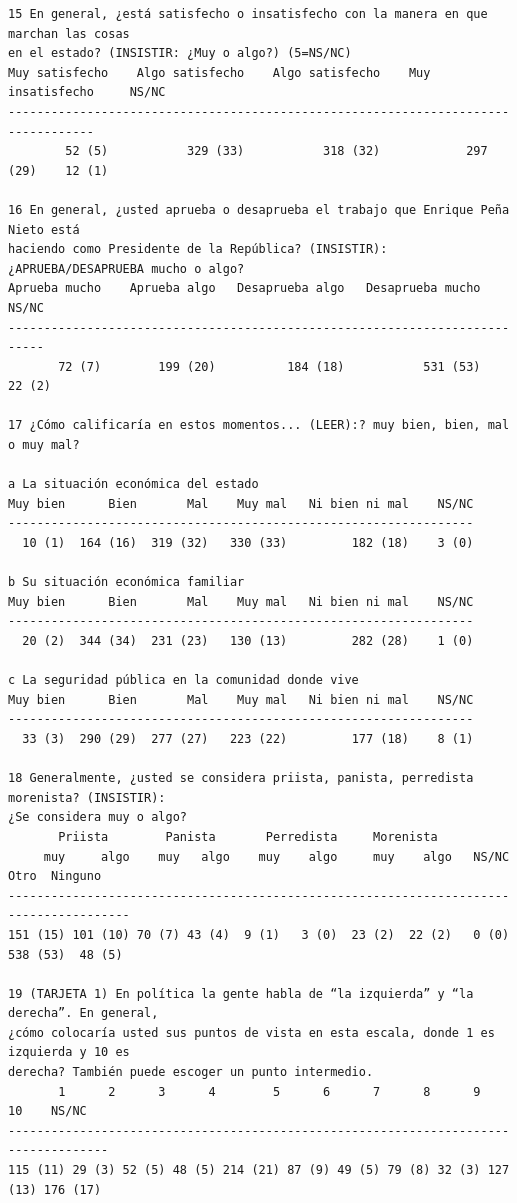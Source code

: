 \documentclass[letter,12pt]{article}
\begin{document}
\begin{scriptsize}
\begin{verbatim}
15 En general, ¿está satisfecho o insatisfecho con la manera en que marchan las cosas 
en el estado? (INSISTIR: ¿Muy o algo?) (5=NS/NC)
Muy satisfecho    Algo satisfecho    Algo satisfecho    Muy insatisfecho     NS/NC
----------------------------------------------------------------------------------
        52 (5)           329 (33)           318 (32)            297 (29)    12 (1) 

16 En general, ¿usted aprueba o desaprueba el trabajo que Enrique Peña Nieto está 
haciendo como Presidente de la República? (INSISTIR): ¿APRUEBA/DESAPRUEBA mucho o algo?
Aprueba mucho    Aprueba algo   Desaprueba algo   Desaprueba mucho    NS/NC 
---------------------------------------------------------------------------
       72 (7)        199 (20)          184 (18)           531 (53)   22 (2) 

17 ¿Cómo calificaría en estos momentos... (LEER):? muy bien, bien, mal o muy mal?

a La situación económica del estado
Muy bien      Bien       Mal    Muy mal   Ni bien ni mal    NS/NC 
-----------------------------------------------------------------
  10 (1)  164 (16)  319 (32)   330 (33)         182 (18)    3 (0) 

b Su situación económica familiar
Muy bien      Bien       Mal    Muy mal   Ni bien ni mal    NS/NC 
-----------------------------------------------------------------
  20 (2)  344 (34)  231 (23)   130 (13)         282 (28)    1 (0) 

c La seguridad pública en la comunidad donde vive
Muy bien      Bien       Mal    Muy mal   Ni bien ni mal    NS/NC 
-----------------------------------------------------------------
  33 (3)  290 (29)  277 (27)   223 (22)         177 (18)    8 (1) 

18 Generalmente, ¿usted se considera priista, panista, perredista morenista? (INSISTIR): 
¿Se considera muy o algo?
       Priista        Panista       Perredista     Morenista
     muy     algo    muy   algo    muy    algo     muy    algo   NS/NC    Otro  Ninguno
---------------------------------------------------------------------------------------
151 (15) 101 (10) 70 (7) 43 (4)  9 (1)   3 (0)  23 (2)  22 (2)   0 (0) 538 (53)  48 (5) 

19 (TARJETA 1) En política la gente habla de “la izquierda” y “la derecha”. En general, 
¿cómo colocaría usted sus puntos de vista en esta escala, donde 1 es izquierda y 10 es 
derecha? También puede escoger un punto intermedio.
       1      2      3      4        5      6      7      8      9       10    NS/NC 
------------------------------------------------------------------------------------
115 (11) 29 (3) 52 (5) 48 (5) 214 (21) 87 (9) 49 (5) 79 (8) 32 (3) 127 (13) 176 (17) 


\end{verbatim}
\end{scriptsize}
\end{document}

